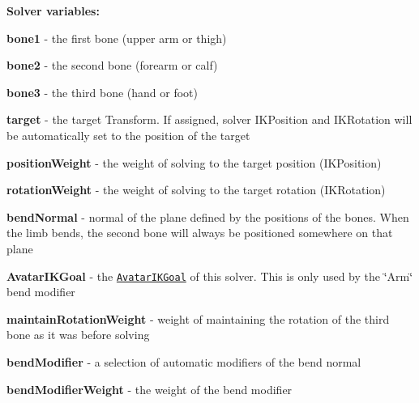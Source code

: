 {\bfseries Solver variables\+:}
\begin{DoxyItemize}
\item {\bfseries bone1} -\/ the first bone (upper arm or thigh)
\item {\bfseries bone2} -\/ the second bone (forearm or calf)
\item {\bfseries bone3} -\/ the third bone (hand or foot)
\item {\bfseries target} -\/ the target Transform. If assigned, solver I\+K\+Position and I\+K\+Rotation will be automatically set to the position of the target
\item {\bfseries position\+Weight} -\/ the weight of solving to the target position (I\+K\+Position)
\item {\bfseries rotation\+Weight} -\/ the weight of solving to the target rotation (I\+K\+Rotation)
\item {\bfseries bend\+Normal} -\/ normal of the plane defined by the positions of the bones. When the limb bends, the second bone will always be positioned somewhere on that plane
\item {\bfseries Avatar\+I\+K\+Goal} -\/ the \href{http://docs.unity3d.com/ScriptReference/AvatarIKGoal.html}{\tt Avatar\+I\+K\+Goal} of this solver. This is only used by the \char`\"{}\+Arm\char`\"{} bend modifier
\item {\bfseries maintain\+Rotation\+Weight} -\/ weight of maintaining the rotation of the third bone as it was before solving
\item {\bfseries bend\+Modifier} -\/ a selection of automatic modifiers of the bend normal
\item {\bfseries bend\+Modifier\+Weight} -\/ the weight of the bend modifier
\end{DoxyItemize}

 